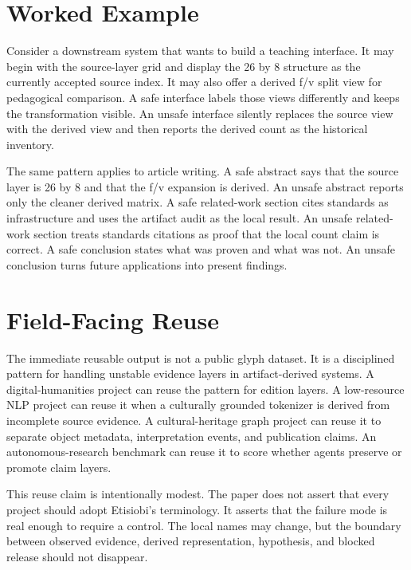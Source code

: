 \documentclass[sigconf,nonacm]{acmart}
\begin{document}
\section{Worked Example}
Consider a downstream system that wants to build a teaching interface. It may
begin with the source-layer grid and display the 26 by 8 structure as the
currently accepted source index. It may also offer a derived f/v split view for
pedagogical comparison. A safe interface labels those views differently and
keeps the transformation visible. An unsafe interface silently replaces the
source view with the derived view and then reports the derived count as the
historical inventory.

The same pattern applies to article writing. A safe abstract says that the
source layer is 26 by 8 and that the f/v expansion is derived. An unsafe abstract
reports only the cleaner derived matrix. A safe related-work section cites
standards as infrastructure and uses the artifact audit as the local result. An
unsafe related-work section treats standards citations as proof that the local
count claim is correct. A safe conclusion states what was proven and what was
not. An unsafe conclusion turns future applications into present findings.

\section{Field-Facing Reuse}
The immediate reusable output is not a public glyph dataset. It is a disciplined
pattern for handling unstable evidence layers in artifact-derived systems. A
digital-humanities project can reuse the pattern for edition layers. A
low-resource NLP project can reuse it when a culturally grounded tokenizer is
derived from incomplete source evidence. A cultural-heritage graph project can
reuse it to separate object metadata, interpretation events, and publication
claims. An autonomous-research benchmark can reuse it to score whether agents
preserve or promote claim layers.

This reuse claim is intentionally modest. The paper does not assert that every
project should adopt Etisiobi's terminology. It asserts that the failure mode is
real enough to require a control. The local names may change, but the boundary
between observed evidence, derived representation, hypothesis, and blocked
release should not disappear.
\end{document}
